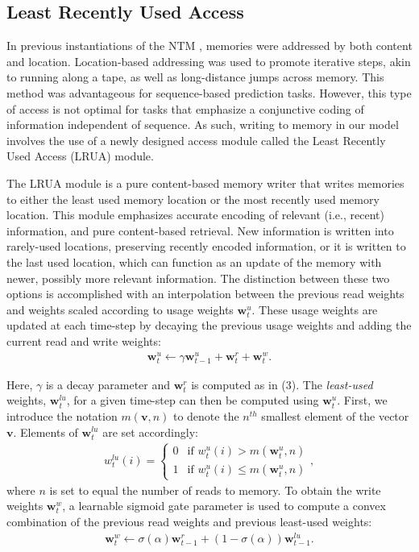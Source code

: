 \documentclass{article}
\begin{document}
\subsection{Least Recently Used Access}
\label{sec:LRUA}

In previous instantiations of the NTM \cite{graves2014neural}, memories were addressed by both content and location. Location-based addressing was used to promote iterative steps, akin to running along a tape, as well as long-distance jumps across memory. This method was advantageous for sequence-based prediction tasks. However, this type of access is not optimal for tasks that emphasize a conjunctive coding of information independent of sequence. As such, writing to memory in our model involves the use of a newly designed access module called the Least Recently Used Access (LRUA) module. 

The LRUA module is a pure content-based memory writer that writes memories to either the least used memory location or the most recently used memory location. This module emphasizes accurate encoding of relevant (i.e., recent) information, and pure content-based retrieval. New information is written into rarely-used locations, preserving recently encoded information, or it is written to the last used location, which can function as an update of the memory with newer, possibly more relevant information. The distinction between these two options is accomplished with an interpolation between the previous read weights and weights scaled according to usage weights $\mathbf{w}_t^u$. These usage weights are updated at each time-step by decaying the previous usage weights and adding the current read and write weights:
\begin{align}
    \mathbf{w}_t^u \leftarrow \gamma \mathbf{w}_{t-1}^u + \mathbf{w}_t^r + \mathbf{w}_t^w.
\end{align}

Here, $\gamma$ is a decay parameter and $\mathbf{w}_t^r$ is computed as in (3). The \textit{least-used} weights, $\mathbf{w}_t^{lu}$, for a given time-step can then be computed using $\mathbf{w}_{t}^u$. First, we introduce the notation $m(\mathbf{v}, n)$ to denote the $n^{th}$ smallest element of the vector $\mathbf{v}$. Elements of $\mathbf{w}_{t}^{lu}$ are set accordingly:
\begin{align}
    w_{t}^{lu}(i) = 
    \left\{
	\begin{array}{ll}
		0  & \mbox{if } w_{t}^{u}(i) > m(\mathbf{w}_{t}^{u}, n) \\
		1  & \mbox{if } w_{t}^{u}(i) \le m(\mathbf{w}_{t}^{u}, n)
	\end{array}
\right. ,
\end{align}
where $n$ is set to equal the number of reads to memory. To obtain the write weights $\mathbf{w}_t^w$, a learnable sigmoid gate parameter is used to compute a convex combination of the previous read weights and previous least-used weights:
\begin{align}
    \mathbf{w}_t^w \leftarrow \sigma(\alpha) \mathbf{w}_{t-1}^r + (1-\sigma(\alpha))\mathbf{w}_{t-1}^{lu}.
\end{align}
\end{document}
